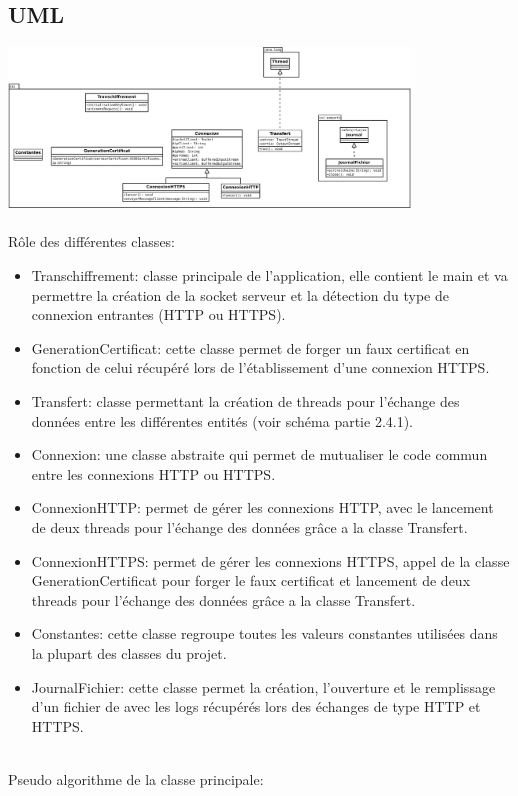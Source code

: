 \documentclass[a4paper,11pt,french]{report}
\begin{document}
\subsection{UML}
\includegraphics[width=0.8\textwidth]{images/uml.pdf}
~~\\
~~\\
Rôle des différentes classes:
\begin{itemize}
	\item Transchiffrement: classe principale de l'application, elle contient le main et va permettre la création de la socket serveur et la détection du type de connexion entrantes (HTTP ou HTTPS).
	\item GenerationCertificat: cette classe permet de forger un faux certificat en fonction de celui récupéré lors de l'établissement d'une connexion HTTPS.
	\item Transfert: classe permettant la création de threads pour l'échange des données entre les différentes entités (voir schéma partie 2.4.1).
	\item Connexion: une classe abstraite qui permet de mutualiser le code commun entre les connexions HTTP ou HTTPS.
	\item ConnexionHTTP: permet de gérer les connexions HTTP, avec le lancement de deux threads pour l'échange des données grâce a la classe Transfert.
	\item ConnexionHTTPS: permet de gérer les connexions HTTPS, appel de la classe GenerationCertificat pour forger le faux certificat et lancement de deux threads pour l'échange des données grâce a la classe Transfert.
	\item Constantes: cette classe regroupe toutes les valeurs constantes utilisées dans la plupart des classes du projet.
	\item JournalFichier: cette classe permet la création, l'ouverture et le remplissage d'un fichier de avec les logs récupérés lors des échanges de type HTTP et HTTPS.
\end{itemize}
~~\\

Pseudo algorithme de la classe principale:~~\\
\end{document}

